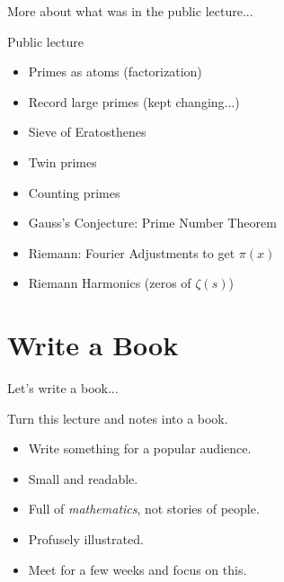 \documentclass{beamer}
\begin{document}
\begin{frame}{More about what was in the public lecture...}
  \begin{block}{Public lecture}
    \begin{itemize}
      \item Primes as atoms (factorization)
      \item Record large primes (kept changing...)
      \item Sieve of Eratosthenes
      \item Twin primes
      \item Counting primes
      \item Gauss's Conjecture: Prime Number Theorem
      \item Riemann: Fourier Adjustments to get $\pi(x)$
      \item Riemann Harmonics (zeros of $\zeta(s)$)
    \end{itemize}

  \end{block}


\end{frame}


\section{Write a Book}

\begin{frame}{Let's write a book...}
  \begin{block}{Turn this lecture and notes into a book.}

    \begin{itemize}
      \item Write something for a popular audience.
      \item Small and readable.
      \item Full of {\em mathematics}, not stories of people.
      \item Profusely illustrated.
      \item Meet for a few weeks and focus on this.
    \end{itemize}
  \end{block}
\end{frame}
\end{document}
